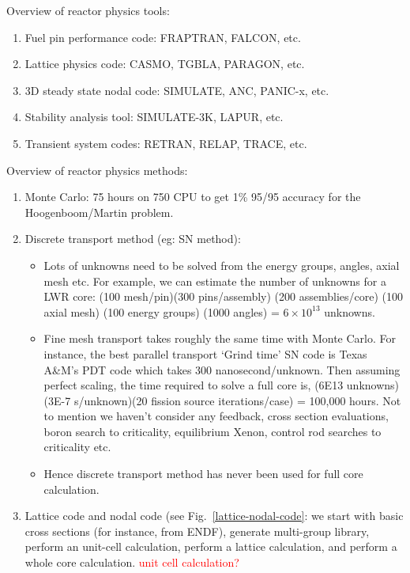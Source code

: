 \documentclass{school-22.211-notes}
\begin{document}
\clearpage
{}
Overview of reactor physics tools: 
\begin{enumerate}
\item Fuel pin performance code: FRAPTRAN, FALCON, etc. 
\item Lattice physics code: CASMO, TGBLA, PARAGON, etc. 
\item 3D steady state nodal code: SIMULATE, ANC, PANIC-x, etc.
\item Stability analysis tool: SIMULATE-3K, LAPUR, etc.
\item Transient system codes: RETRAN, RELAP, TRACE, etc.
\end{enumerate}
Overview of reactor physics methods:
\begin{enumerate}
\item Monte Carlo: 75 hours on 750 CPU to get 1\% 95/95 accuracy for the Hoogenboom/Martin problem. 

\item Discrete transport method (eg: SN method): 
  \begin{itemize}
    \item Lots of unknowns need to be solved from the energy groups, angles, axial mesh etc. For example, we can estimate the number of unknowns for a LWR core: (100 mesh/pin)(300 pins/assembly) (200 assemblies/core) (100 axial mesh) (100 energy groups) (1000 angles) = $6 \times 10^{13}$ unknowns. 
    \item Fine mesh transport takes roughly the same time with Monte Carlo. For instance, the best parallel transport `Grind time' SN code is Texas A\&M's PDT code which takes 300 nanosecond/unknown. Then assuming perfect scaling, the time required to solve a full core is, (6E13 unknowns)(3E-7 s/unknown)(20 fission source iterations/case) = 100,000 hours. Not to mention we haven't consider any feedback, cross section evaluations, boron search to criticality, equilibrium Xenon, control rod searches to criticality etc. 
    \item Hence discrete transport method has never been used for full core calculation. 
  \end{itemize}

\item Lattice code and nodal code (see Fig.~\ref{lattice-nodal-code}: we start with basic cross sections (for instance, from ENDF), generate multi-group library, perform an unit-cell calculation, perform a lattice calculation, and perform a whole core calculation. \textcolor{red}{unit cell calculation?}
\end{enumerate}
\end{document}
